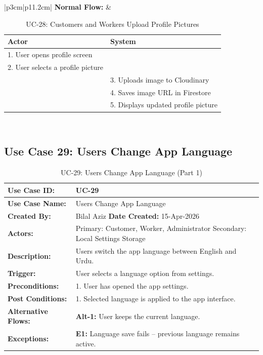 \newpage

{\small
\renewcommand{\arraystretch}{1.05}
\begin{table}[H]
\centering
\begin{tabular}{|p{3cm}|p{11.2cm}|}
\hline
\textbf{Normal Flow:} &
\begin{tabular}[t]{|p{5.4cm}|p{5.4cm}|}
\hline
\textbf{Actor} & \textbf{System} \\ \hline
1. User opens profile screen & \\ \hline
2. User selects a profile picture & \\ \hline
 & 3. Uploads image to Cloudinary \\ \hline
 & 4. Saves image URL in Firestore \\ \hline
 & 5. Displays updated profile picture \\ \hline
\end{tabular} \\ \hline
\end{tabular}
\caption{UC-28: Customers and Workers Upload Profile Pictures}
\end{table}
}

\newpage

\subsection*{Use Case 29: Users Change App Language}

{\small
\renewcommand{\arraystretch}{1.05}
\begin{table}[H]
\centering
\begin{tabular}{|p{3cm}|p{11.2cm}|}
\hline
\textbf{Use Case ID:} & UC-29 \\ \hline
\textbf{Use Case Name:} & Users Change App Language \\ \hline
\textbf{Created By:} & Bilal Aziz \hfill \textbf{Date Created:} 15-Apr-2026 \\ \hline
\textbf{Actors:} & Primary: Customer, Worker, Administrator \quad Secondary: Local Settings Storage \\ \hline
\textbf{Description:} & Users switch the app language between English and Urdu. \\ \hline
\textbf{Trigger:} & User selects a language option from settings. \\ \hline
\textbf{Preconditions:} & 1. User has opened the app settings. \\ \hline
\textbf{Post Conditions:} & 1. Selected language is applied to the app interface. \\ \hline
\textbf{Alternative Flows:} & \textbf{Alt-1:} User keeps the current language. \\ \hline
\textbf{Exceptions:} & \textbf{E1:} Language save fails -- previous language remains active. \\ \hline
\end{tabular}
\caption*{UC-29: Users Change App Language (Part 1)}
\end{table}
}

